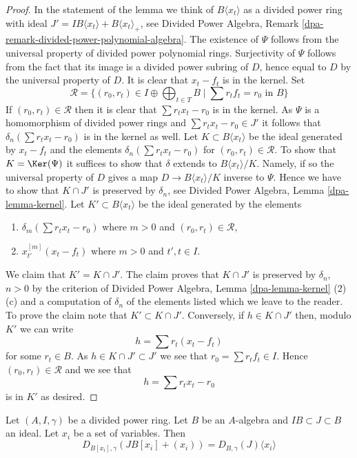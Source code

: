 \begin{proof}
In the statement of the lemma we think of $B\langle x_t \rangle$
as a divided power ring with ideal
$J' = IB\langle x_t \rangle + B\langle x_t \rangle_{+}$, see
Divided Power Algebra, Remark \ref{dpa-remark-divided-power-polynomial-algebra}.
The existence of $\Psi$ follows from the universal property of
divided power polynomial rings. Surjectivity of $\Psi$ follows from
the fact that its image is a divided power subring of $D$, hence equal to $D$
by the universal property of $D$. It is clear that
$x_t - f_t$ is in the kernel. Set
$$
\mathcal{R} = \{(r_0, r_t) \in I \oplus \bigoplus\nolimits_{t \in T} B
\mid \sum r_t f_t = r_0 \text{ in }B\}
$$
If $(r_0, r_t) \in \mathcal{R}$ then it is clear that
$\sum r_t x_t - r_0$ is in the kernel.
As $\Psi$ is a homomorphism of divided power rings
and $\sum r_tx_t - r_0 \in J'$
it follows that $\delta_n(\sum r_t x_t - r_0)$ is in the kernel as well.
Let $K \subset B\langle x_t \rangle$ be the ideal generated by
$x_t - f_t$ and the elements $\delta_n(\sum r_t x_t - r_0)$ for
$(r_0, r_t) \in \mathcal{R}$.
To show that $K = \Ker(\Psi)$ it suffices to show that
$\delta$ extends to $B\langle x_t \rangle/K$. Namely, if so the universal
property of $D$ gives a map $D \to B\langle x_t \rangle/K$
inverse to $\Psi$. Hence we have to show that $K \cap J'$ is
preserved by $\delta_n$, see
Divided Power Algebra, Lemma \ref{dpa-lemma-kernel}.
Let $K' \subset B\langle x_t \rangle$ be the ideal
generated by the elements
\begin{enumerate}
\item $\delta_m(\sum r_t x_t - r_0)$ where $m > 0$ and
$(r_0, r_t) \in \mathcal{R}$,
\item $x_{t'}^{[m]}(x_t - f_t)$ where $m > 0$ and $t', t \in I$.
\end{enumerate}
We claim that $K' = K \cap J'$. The claim proves that $K \cap J'$
is preserved by $\delta_n$, $n > 0$ by the criterion of
Divided Power Algebra, Lemma \ref{dpa-lemma-kernel} (2)(c)
and a computation of $\delta_n$
of the elements listed which we leave to the reader.
To prove the claim note that $K' \subset K \cap J'$.
Conversely, if $h \in K \cap J'$ then, modulo $K'$ we can write
$$
h = \sum r_t (x_t - f_t)
$$
for some $r_t \in B$. As $h \in K \cap J' \subset J'$
we see that $r_0 = \sum r_t f_t \in I$. Hence $(r_0, r_t) \in \mathcal{R}$
and we see that
$$
h = \sum r_t x_t - r_0
$$
is in $K'$ as desired.
\end{proof}

\begin{lemma}
\label{lemma-divided-power-envelope-add-variables}
Let $(A, I, \gamma)$ be a divided power ring.
Let $B$ be an $A$-algebra and $IB \subset J \subset B$ an ideal.
Let $x_i$ be a set of variables. Then
$$
D_{B[x_i], \gamma}(JB[x_i] + (x_i)) = D_{B, \gamma}(J) \langle x_i \rangle
$$
\end{lemma}

